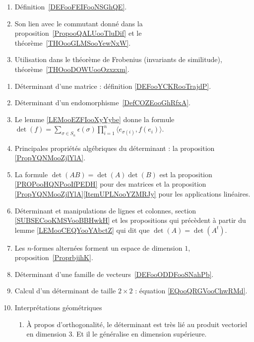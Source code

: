     \begin{enumerate}
        \item
            Définition~\ref{DEFooFEIFooNSGhQE}.
        \item
            Son lien avec le commutant donné dans la proposition~\ref{PropooQALUooTluDif} et le théorème~\ref{THOooGLMSooYewNxW}.
        \item
            Utilisation dans le théorème de Frobenius (invariants de similitude), théorème~\ref{THOooDOWUooOzxzxm}.
        \end{enumerate}


     \label{THMooUXJMooOroxbI}
    \begin{enumerate}
        \item
            Déterminant d'une matrice : définition \ref{DEFooYCKRooTrajdP}.
    \item
        Déterminant d'un endomorphisme~\ref{DefCOZEooGhRfxA}. 
    \item
        Le lemme \ref{LEMooEZFIooXyYybe} donne la formule $\det(f)=\sum_{\sigma\in S_n}\epsilon(\sigma)\prod_{i=1}^n\langle e_{\sigma(i)}, f(e_i)\rangle$.
    \item
        Principales propriétés algébriques du déterminant : la proposition \ref{PropYQNMooZjlYlA}.
    \item
        La formule \( \det(AB)=\det(A)\det(B)\) est la proposition \ref{PROPooHQNPooIfPEDH} pour des matrices et la proposition \ref{PropYQNMooZjlYlA}\ref{ItemUPLNooYZMRJy} pour les applications linéaires.
        \item
            Déterminant et manipulations de lignes et colonnes, section \ref{SUBSECooKMSVooBBHwkH} et les propositions qui précèdent à partir du lemme \ref{LEMooCEQYooYAbctZ} qui dit que \( \det(A)=\det(A^t)\).
    \item
        Les \( n\)-formes alternées forment un espace de dimension \( 1\), proposition~\ref{ProprbjihK}.
    \item
        Déterminant d'une famille de vecteurs~\ref{DEFooODDFooSNahPb}.
    \item
        Calcul d'un déterminant de taille \( 2\times 2\) : équation \eqref{EQooQRGVooChwRMd}.
    \item
        Interprétations géométriques
            \begin{enumerate}
        \item
            À propos d'orthogonalité, le déterminant est très lié au produit vectoriel en dimension \( 3\). Et il le généralise en dimension supérieure.

\end{enumerate}
\end{enumerate}

